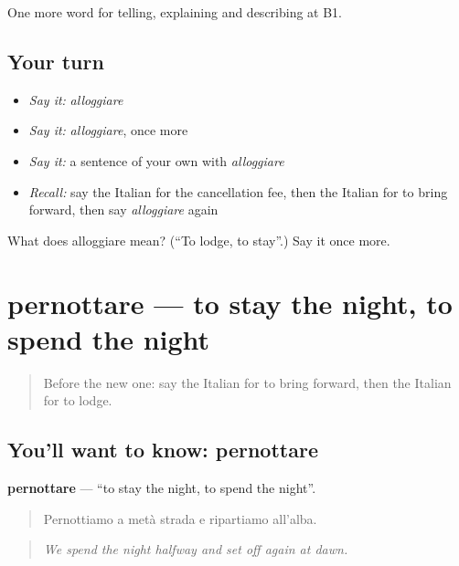 \begin{grammarlens}[title={What you've built}]
One more word for telling, explaining and describing at B1.
\end{grammarlens}

\subsection*{Your turn}
\begin{itemize}
\raggedright
  \item \emph{Say it:} \emph{alloggiare}
  \item \emph{Say it:} \emph{alloggiare}, once more
  \item \emph{Say it:} a sentence of your own with \emph{alloggiare}
  \item \emph{Recall:} say the Italian for the cancellation fee, then the Italian for to bring forward, then say \emph{alloggiare} again
\end{itemize}

\begin{tcolorbox}[breakable,colback=teal!4,colframe=teal!35!black,title={Before you move on}]
What does alloggiare mean? (\textquotedblleft{}To lodge, to stay\textquotedblright{}.) Say it once more.
\end{tcolorbox}
\section[pernottare]{pernottare — to stay the night, to spend the night}

\label{lesson:IT-C432-pernottare}



\begin{quote}
Before the new one: say the Italian for to bring forward, then the Italian for to lodge.
\end{quote}

\subsection*{You'll want to know: pernottare}
\textbf{pernottare} — \textquotedblleft{}to stay the night, to spend the night\textquotedblright{}.

\begin{quote}
Pernottiamo a metà strada e ripartiamo all'alba.
\end{quote}

\begin{quote}
\emph{We spend the night halfway and set off again at dawn.}
\end{quote}

